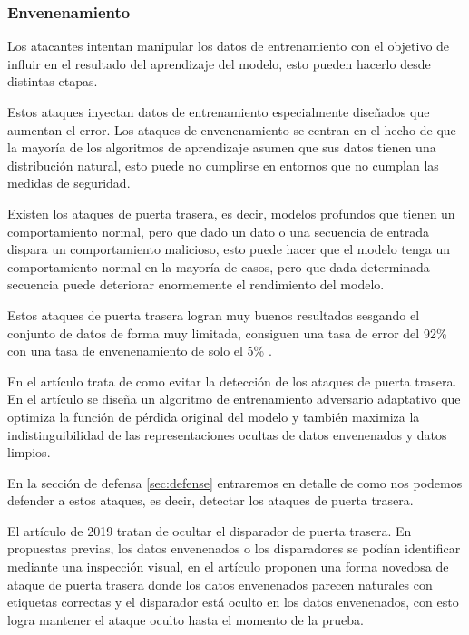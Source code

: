 
\subsubsection{Envenenamiento}

Los atacantes intentan manipular los datos de entrenamiento con el objetivo de influir en el resultado del aprendizaje del modelo, esto pueden hacerlo desde distintas etapas.

Estos ataques inyectan datos de entrenamiento especialmente diseñados que aumentan el error. Los ataques de envenenamiento se centran en el hecho de que la mayoría de los algoritmos de aprendizaje asumen que sus datos tienen una distribución natural, esto puede no cumplirse en entornos que no cumplan las medidas de seguridad. \cite{biggio2013poisoning}

Existen los ataques de puerta trasera, es decir, modelos profundos que tienen un comportamiento normal, pero que dado un dato o una secuencia de entrada dispara un comportamiento malicioso, esto puede hacer que el modelo tenga un comportamiento normal en la mayoría de casos, pero que dada determinada secuencia puede deteriorar enormemente el rendimiento del modelo. \cite{gu2019badnets}

Estos ataques de puerta trasera logran muy buenos resultados sesgando el conjunto de datos de forma muy limitada, consiguen una tasa de error del 92\% con una tasa de envenenamiento de solo el 5\% \cite{cheng2023attacking}.

En el artículo \cite{tan2020bypassing} trata de como evitar la detección de los ataques de puerta trasera. En el artículo se diseña un algoritmo de entrenamiento adversario adaptativo que optimiza la función de pérdida original del modelo y también maximiza la indistinguibilidad de las representaciones ocultas de datos envenenados y datos limpios.

En la sección de defensa \ref{sec:defense} entraremos en detalle de como nos podemos defender a estos ataques, es decir, detectar los ataques de puerta trasera.

El artículo \cite{saha2019hidden} de 2019 tratan de ocultar el disparador de puerta trasera. En propuestas previas, los datos envenenados o los disparadores se podían identificar mediante una inspección visual, en el artículo proponen una forma novedosa de ataque de puerta trasera donde los datos envenenados parecen naturales con etiquetas correctas y el disparador está oculto en los datos envenenados, con esto logra mantener el ataque oculto hasta el momento de la prueba.

